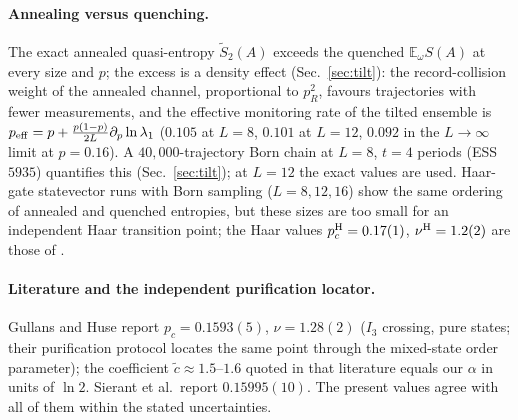 \documentclass[11pt]{article}
\newcommand{\E}{\mathbb{E}}
\begin{document}
\paragraph{Annealing versus quenching.}
The exact annealed quasi-entropy $\tilde S_2(A)$ exceeds the quenched
$\E_\omega S(A)$ at every size and $p$; the excess is a density effect
(Sec.~\ref{sec:tilt}): the record-collision weight of the annealed channel,
proportional to $p_R^2$, favours trajectories with fewer measurements, and
the effective monitoring rate of the tilted ensemble is
$p_{\rm eff}=p+\frac{p(1-p)}{2L}\partial_p\ln\lambda_1$
($0.105$ at $L=8$, $0.101$ at $L=12$, $0.092$ in the $L\to\infty$ limit at
$p=0.16$).  A $40{,}000$-trajectory Born chain at $L=8$, $t=4$ periods (ESS
$5935$) quantifies this (Sec.~\ref{sec:tilt}); at $L=12$ the exact values
are used.  Haar-gate statevector runs with Born sampling ($L=8,12,16$) show
the same ordering of annealed and quenched entropies, but these sizes are
too small for an independent Haar transition point; the Haar values
$p_c^{\rm H}=0.17(1)$, $\nu^{\rm H}=1.2(2)$ are those of \citet{Zabalo2020}.

\paragraph{Literature and the independent purification locator.}
Gullans and Huse report $p_c=0.1593(5)$, $\nu=1.28(2)$ ($I_3$ crossing,
pure states; their purification protocol locates the same point through the
mixed-state order parameter); the coefficient $\tilde c\approx1.5$--$1.6$
quoted in that literature equals our $\alpha$ in units of $\ln 2$.
Sierant et al.\ report $0.15995(10)$.  The present values agree with all of
them within the stated uncertainties.
\end{document}
